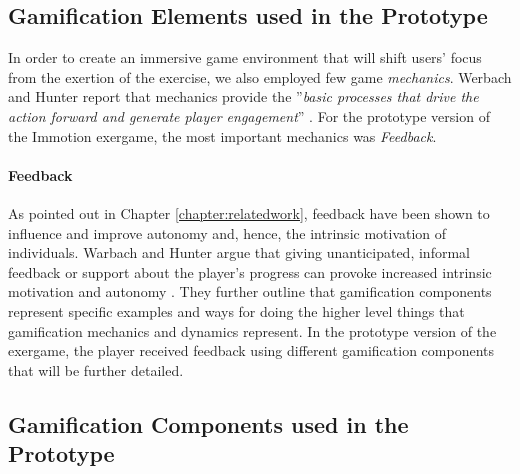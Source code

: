 \subsection{Gamification Elements used in the Prototype}
In order to create an immersive game environment that will shift users' focus from the exertion of the exercise, we also employed few game \textit{mechanics}.  Werbach and Hunter report that mechanics provide the ''\textit{basic processes that drive the action forward and generate
player engagement}'' \cite{werbach2012win}. For the prototype version of the Immotion exergame, the most important mechanics was \textit{Feedback}.
\paragraph{Feedback}
As pointed out in Chapter \ref{chapter:relatedwork}, feedback have been shown to influence and improve autonomy and, hence, the intrinsic motivation of individuals. %
Warbach and Hunter argue that giving unanticipated, informal feedback or support about the player's progress can provoke increased intrinsic motivation and autonomy \cite{werbach2012win}. They further outline that gamification components represent specific examples and ways for doing the higher level things that gamification mechanics and dynamics represent. In the prototype version of the exergame, the player received feedback using different gamification components that will be further detailed.
\subsection{Gamification Components used in the Prototype}
